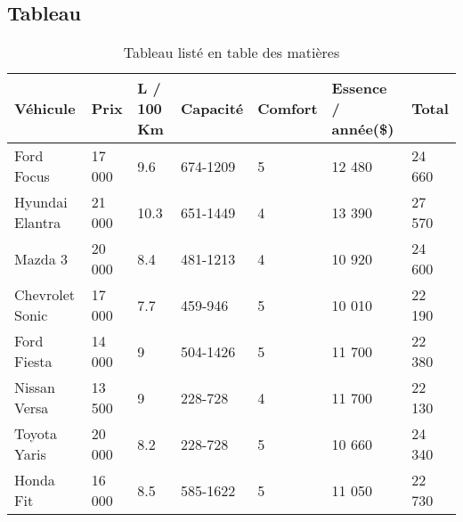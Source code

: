 \subsection{Tableau}
\begin{table}[!ht]
\caption{Tableau listé en table des matières}
\medskip
\centering
\begin{tabular}{||l|l|l|l|l|l|l||}
\hline 
\textbf{Véhicule} & \textbf{Prix} & \textbf{L / 100 Km} & \textbf{Capacité} & \textbf{Comfort} & \textbf{Essence / année(\$)} & \textbf{Total} \\ 
\hline 
Ford Focus & 17 000 & 9.6 & 674-1209 & 5 & 12 480 & 24 660 \\ 
\hline 
Hyundai Elantra & 21 000 & 10.3 & 651-1449 & 4 & 13 390 & 27 570 \\ 
\hline 
Mazda 3 & 20 000 & 8.4 & 481-1213 & 4 & 10 920 & 24 600 \\ 
\hline 
Chevrolet Sonic & 17 000 & 7.7 & 459-946 & 5 & 10 010 & 22 190 \\ 
\hline 
Ford Fiesta & 14 000 & 9 & 504-1426 & 5 & 11 700 & 22 380 \\ 
\hline 
Nissan Versa & 13 500 & 9 & 228-728 & 4 & 11 700 & 22 130 \\ 
\hline 
Toyota Yaris  & 20 000 & 8.2 & 228-728 & 5 & 10 660 & 24 340 \\ 
\hline 
Honda Fit & 16 000 & 8.5 & 585-1622 & 5 & 11 050 & 22 730 \\ 
\hline 
\end{tabular} 
\label{tab:testtab1}
\end{table}

\pagebreak

